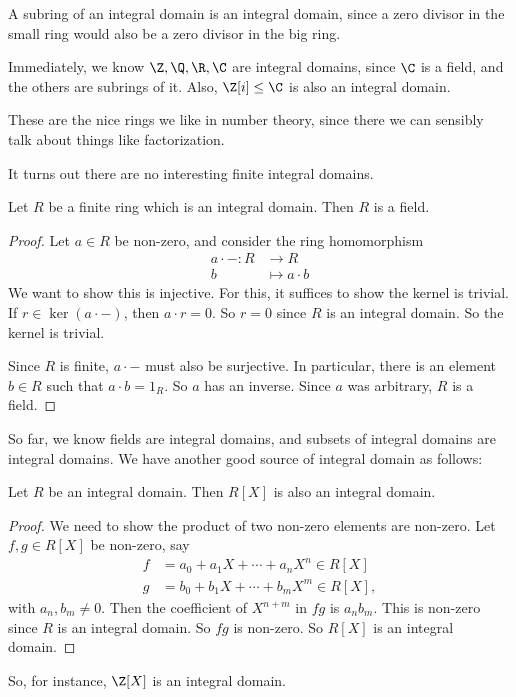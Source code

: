 \documentclass[a4paper]{article}
\begin{document}
\begin{eg}
  A subring of an integral domain is an integral domain, since a zero divisor in the small ring would also be a zero divisor in the big ring.
\end{eg}

\begin{eg}
  Immediately, we know $\Z, \Q, \R, \C$ are integral domains, since $\C$ is a field, and the others are subrings of it. Also, $\Z[i] \leq \C$ is also an integral domain.
\end{eg}
These are the nice rings we like in number theory, since there we can sensibly talk about things like factorization.

It turns out there are no interesting finite integral domains.
\begin{lemma}
  Let $R$ be a finite ring which is an integral domain. Then $R$ is a field.
\end{lemma}

\begin{proof}
  Let $a \in R$ be non-zero, and consider the ring homomorphism
  \begin{align*}
    a \cdot -: R &\to R\\
    b &\mapsto a \cdot b
  \end{align*}
  We want to show this is injective. For this, it suffices to show the kernel is trivial. If $r \in \ker (a \cdot -)$, then $a \cdot r = 0$. So $r = 0$ since $R$ is an integral domain. So the kernel is trivial.

  Since $R$ is finite, $a\cdot -$ must also be surjective. In particular, there is an element $b \in R$ such that $a \cdot b = 1_R$. So $a$ has an inverse. Since $a$ was arbitrary, $R$ is a field.
\end{proof}

So far, we know fields are integral domains, and subsets of integral domains are integral domains. We have another good source of integral domain as follows:
\begin{lemma}
  Let $R$ be an integral domain. Then $R[X]$ is also an integral domain.
\end{lemma}

\begin{proof}
  We need to show the product of two non-zero elements are non-zero. Let $f, g\in R[X]$ be non-zero, say
  \begin{align*}
    f &= a_0 + a_1X + \cdots + a_n X^n \in R[X]\\
    g &= b_0 + b_1X + \cdots + b_m X^m \in R[X],
  \end{align*}
  with $a_n, b_m \not= 0$. Then the coefficient of $X^{n + m}$ in $fg$ is $a_n b_m$. This is non-zero since $R$ is an integral domain. So $fg$ is non-zero. So $R[X]$ is an integral domain.
\end{proof}
So, for instance, $\Z[X]$ is an integral domain.
\end{document}
